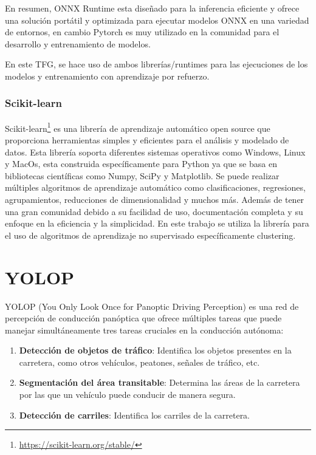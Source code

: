 En resumen, ONNX Runtime esta diseñado para la inferencia eficiente y ofrece una solución portátil y optimizada para ejecutar modelos ONNX en una variedad de entornos, en cambio Pytorch es muy utilizado 
en la comunidad para el desarrollo y entrenamiento de modelos. 

En este TFG, se hace uso de ambos librerías/runtimes para las ejecuciones de los modelos y entrenamiento con aprendizaje por refuerzo.

\subsubsection{Scikit-learn}
\label{Scikit-learn}

Scikit-learn\footnote{\url{https://scikit-learn.org/stable/}} es una librería de aprendizaje automático open source que proporciona herramientas simples y eficientes para el análisis 
y modelado de datos. Esta librería soporta diferentes sistemas operativos como Windows, Linux y MacOs, esta construida específicamente para Python ya que se basa en bibliotecas
científicas como Numpy, SciPy y Matplotlib. Se puede realizar múltiples algoritmos de aprendizaje automático como clasificaciones, regresiones, agrupamientos, reducciones de dimensionalidad y 
muchos más.
Además de tener una gran comunidad debido a su facilidad de uso, documentación completa y su enfoque en la eficiencia y la simplicidad. En este trabajo se utiliza la librería para el uso
de algoritmos de aprendizaje no supervisado específicamente clustering. 

\section{YOLOP}
\label{sec:YOLOP}
YOLOP \cite{YOLOP} (You Only Look Once for Panoptic Driving Perception) es una red de percepción
de conducción panóptica que ofrece múltiples tareas que puede
manejar simultáneamente tres tareas cruciales en la conducción autónoma: 
\begin{enumerate}
  \item \textbf{Detección de objetos de tráfico}: Identifica los objetos presentes en la carretera, como otros vehículos, peatones, señales de tráfico, etc.
  \item \textbf{Segmentación del área transitable}: Determina las áreas de la carretera por las que un vehículo puede conducir de manera segura.
  \item \textbf{Detección de carriles}: Identifica los carriles de la carretera.
\end{enumerate}


